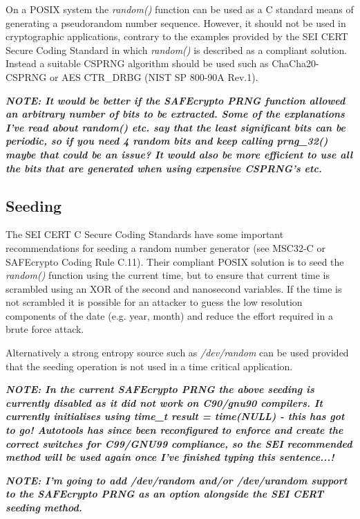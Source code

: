 On a POSIX system the \textit{random()} function can be used as a C standard means of generating a pseudorandom number sequence. However, it should not be used in cryptographic applications, contrary to the examples provided by the SEI CERT Secure Coding Standard in which \textit{random()} is described as a compliant solution. Instead a suitable CSPRNG algorithm should be used such as ChaCha20-CSPRNG or AES CTR\_DRBG (NIST SP 800-90A Rev.1).

\textbf{\textit{NOTE: It would be better if the SAFEcrypto PRNG function allowed an arbitrary number of bits to be extracted. Some of the explanations I've read about random() etc. say that the least significant bits can be periodic, so if you need 4 random bits and keep calling prng\_32() maybe that could be an issue? It would also be more efficient to use all the bits that are generated when using expensive CSPRNG's etc.}}


\subsection{Seeding}

The SEI CERT C Secure Coding Standards have some important recommendations for seeding a random number generator (see MSC32-C or SAFEcrypto Coding Rule C.11). Their compliant POSIX solution is to seed the \textit{random()} function using the current time, but to ensure that current time is scrambled using an XOR of the second and nanosecond variables. If the time is not scrambled it is possible for an attacker to guess the low resolution components of the date (e.g. year, month) and reduce the effort required in a brute force attack.

Alternatively a strong entropy source such as \textit{/dev/random} can be used provided that the seeding operation is not used in a time critical application.

\textbf{\textit{NOTE: In the current SAFEcrypto PRNG the above seeding is currently disabled as it did not work on C90/gnu90 compilers. It currently initialises using time\_t result = time(NULL) - this has got to go! Autotools has since been reconfigured to enforce and create the correct switches for C99/GNU99 compliance, so the SEI recommended method will be used again once I've finished typing this sentence...!}}

\textbf{\textit{NOTE: I'm going to add /dev/random and/or /dev/urandom support to the SAFEcrypto PRNG as an option alongside the SEI CERT seeding method.}}



